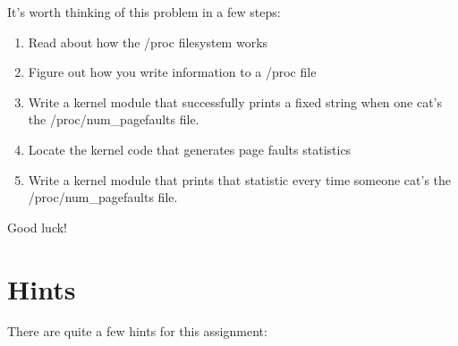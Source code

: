 \documentclass[11pt]{article}
\begin{document}
It's worth thinking of this problem in a few steps:

\begin{enumerate}
\item Read about how the /proc filesystem works
\item Figure out how you write information to a /proc file
\item Write a kernel module that successfully prints a fixed string when one cat's the /proc/num\_pagefaults file. 
\item Locate the kernel code that generates page faults statistics
\item Write a kernel module that prints that statistic every time someone cat's the /proc/num\_pagefaults file.
\end{enumerate}

Good luck!

\section*{Hints}

There are quite a few hints for this assignment:
\end{document}
